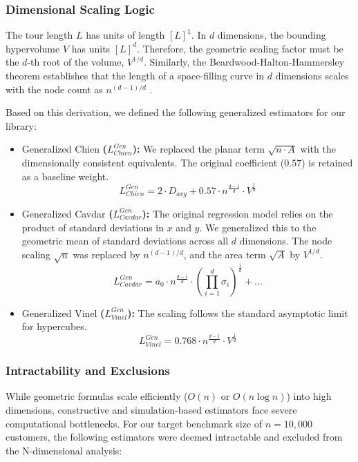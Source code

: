 \documentclass{article}
\begin{document}
\subsubsection{Dimensional Scaling Logic}
The tour length $L$ has units of length $[L]^1$. In $d$ dimensions, the bounding hypervolume $V$ has units $[L]^d$. Therefore, the geometric scaling factor must be the $d$-th root of the volume, $V^{1/d}$. Similarly, the Beardwood-Halton-Hammersley theorem establishes that the length of a space-filling curve in $d$ dimensions scales with the node count as $n^{(d-1)/d}$ \cite{bhh1959}.

Based on this derivation, we defined the following generalized estimators for our library:

\begin{itemize}
    \item Generalized Chien\textbf{ ($L_{Chien}^{Gen}$):} We replaced the planar term $\sqrt{n \cdot A}$ with the dimensionally consistent equivalents. The original coefficient ($0.57$) is retained as a baseline weight.
    \begin{equation}
        L_{Chien}^{Gen} = 2 \cdot D_{avg} + 0.57 \cdot n^{\frac{d-1}{d}} \cdot V^{\frac{1}{d}}
    \end{equation}
    
    \item Generalized Cavdar\textbf{ ($L_{Cavdar}^{Gen}$):} The original regression model relies on the product of standard deviations in $x$ and $y$. We generalized this to the geometric mean of standard deviations across all $d$ dimensions. The node scaling $\sqrt{n}$ was replaced by $n^{(d-1)/d}$, and the area term $\sqrt{A}$ by $V^{1/d}$.
    \begin{equation}
        L_{Cavdar}^{Gen} = a_0 \cdot n^{\frac{d-1}{d}} \cdot \left(\prod_{i=1}^{d} \sigma_i\right)^{\frac{1}{d}} + \dots
    \end{equation}
    
    \item Generalized Vinel\textbf{ ($L_{Vinel}^{Gen}$):} The scaling follows the standard asymptotic limit for hypercubes.
    \begin{equation}
        L_{Vinel}^{Gen} = 0.768 \cdot n^{\frac{d-1}{d}} \cdot V^{\frac{1}{d}}
    \end{equation}
\end{itemize}

\subsubsection{Intractability and Exclusions}
While geometric formulas scale efficiently ($O(n)$ or $O(n \log n)$) into high dimensions, constructive and simulation-based estimators face severe computational bottlenecks. For our target benchmark size of $n=10,000$ customers, the following estimators were deemed intractable and excluded from the N-dimensional analysis:
\end{document}
